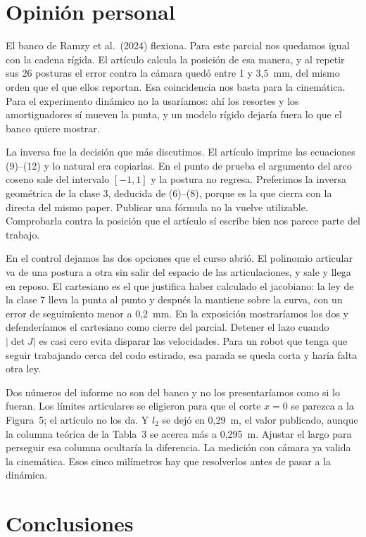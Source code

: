 \documentclass[11pt,a4paper]{article}
\begin{document}
\section{Opinión personal}

El banco de Ramzy et al.\ (2024) flexiona. Para este parcial nos quedamos igual con la cadena rígida. El artículo calcula la posición de esa manera, y al repetir sus 26 posturas el error contra la cámara quedó entre 1 y 3,5~mm, del mismo orden que el que ellos reportan. Esa coincidencia nos basta para la cinemática. Para el experimento dinámico no la usaríamos: ahí los resortes y los amortiguadores sí mueven la punta, y un modelo rígido dejaría fuera lo que el banco quiere mostrar.

La inversa fue la decisión que más discutimos. El artículo imprime las ecuaciones (9)--(12) y lo natural era copiarlas. En el punto de prueba el argumento del arco coseno sale del intervalo \([-1,1]\) y la postura no regresa. Preferimos la inversa geométrica de la clase 3, deducida de (6)--(8), porque es la que cierra con la directa del mismo paper. Publicar una fórmula no la vuelve utilizable. Comprobarla contra la posición que el artículo sí escribe bien nos parece parte del trabajo.

En el control dejamos las dos opciones que el curso abrió. El polinomio articular va de una postura a otra sin salir del espacio de las articulaciones, y sale y llega en reposo. El cartesiano es el que justifica haber calculado el jacobiano: la ley de la clase 7 lleva la punta al punto y después la mantiene sobre la curva, con un error de seguimiento menor a 0,2~mm. En la exposición mostraríamos los dos y defenderíamos el cartesiano como cierre del parcial. Detener el lazo cuando \(|\det J|\) es casi cero evita disparar las velocidades. Para un robot que tenga que seguir trabajando cerca del codo estirado, esa parada se queda corta y haría falta otra ley.

Dos números del informe no son del banco y no los presentaríamos como si lo fueran. Los límites articulares se eligieron para que el corte \(x=0\) se parezca a la Figura~5; el artículo no los da. Y \(l_2\) se dejó en 0,29~m, el valor publicado, aunque la columna teórica de la Tabla~3 se acerca más a 0,295~m. Ajustar el largo para perseguir esa columna ocultaría la diferencia. La medición con cámara ya valida la cinemática. Esos cinco milímetros hay que resolverlos antes de pasar a la dinámica.

\section{Conclusiones}
\end{document}
